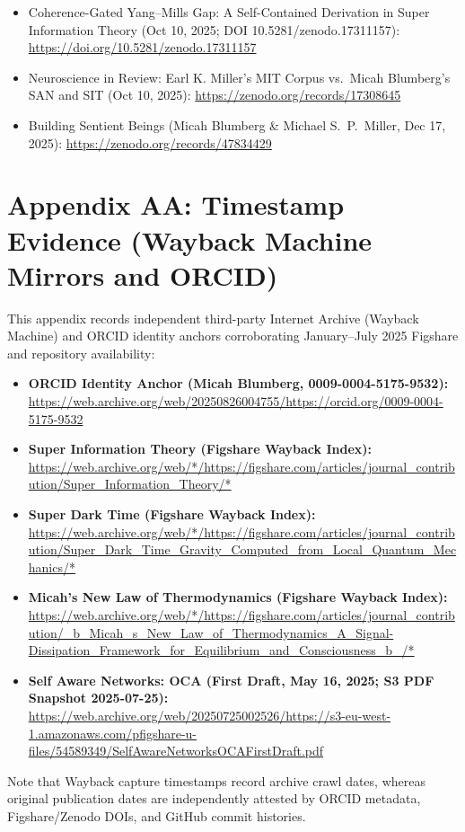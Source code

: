 \documentclass[american,11pt,letterpaper]{article}
\def\texttt#1{#1}%
\def\emph#1{#1}%
\begin{document}
\begin{itemize}
  \item \emph{Coherence-Gated Yang--Mills Gap: A Self-Contained Derivation in Super Information Theory} (Oct 10, 2025; DOI \texttt{10.\allowbreak{}5281/zenodo.\allowbreak{}17311157}): \url{https://doi.org/10.5281/zenodo.17311157}
  \item \emph{Neuroscience in Review: Earl K. Miller's MIT Corpus vs.\ Micah Blumberg's SAN and SIT} (Oct 10, 2025): \url{https://zenodo.org/records/17308645}
  \item \emph{Building Sentient Beings} (Micah Blumberg \& Michael S.\ P.\ Miller, Dec 17, 2025): \url{https://zenodo.org/records/47834429}
\end{itemize}

\setcounter{subsection}{0}
\renewcommand{\thesection}{AA}
\renewcommand{\thesubsection}{AA.\arabic{subsection}}
\section*{Appendix AA: Timestamp Evidence (Wayback Machine Mirrors and ORCID)}
\label{app:timestamp-aa}

This appendix records independent third-party Internet Archive (Wayback Machine) and ORCID identity anchors corroborating January--July 2025 Figshare and repository availability:
\begin{itemize}
  \item \textbf{ORCID Identity Anchor (Micah Blumberg, \texttt{0009-0004-5175-9532}):} \url{https://web.archive.org/web/20250826004755/https://orcid.org/0009-0004-5175-9532}
  \item \textbf{Super Information Theory (Figshare Wayback Index):} \url{https://web.archive.org/web/*/https://figshare.com/articles/journal_contribution/Super_Information_Theory/*}
  \item \textbf{Super Dark Time (Figshare Wayback Index):} \url{https://web.archive.org/web/*/https://figshare.com/articles/journal_contribution/Super_Dark_Time_Gravity_Computed_from_Local_Quantum_Mechanics/*}
  \item \textbf{Micah's New Law of Thermodynamics (Figshare Wayback Index):} \url{https://web.archive.org/web/*/https://figshare.com/articles/journal_contribution/_b_Micah_s_New_Law_of_Thermodynamics_A_Signal-Dissipation_Framework_for_Equilibrium_and_Consciousness_b_/*}
  \item \textbf{Self Aware Networks: OCA (First Draft, May 16, 2025; S3 PDF Snapshot 2025-07-25):} \url{https://web.archive.org/web/20250725002526/https://s3-eu-west-1.amazonaws.com/pfigshare-u-files/54589349/SelfAwareNetworksOCAFirstDraft.pdf}
\end{itemize}
Note that Wayback capture timestamps record archive crawl dates, whereas original publication dates are independently attested by ORCID metadata, Figshare/Zenodo DOIs, and GitHub commit histories.
\setcounter{subsection}{0}
\renewcommand{\thesection}{AB}
\renewcommand{\thesubsection}{AB.\arabic{subsection}}
\end{document}
